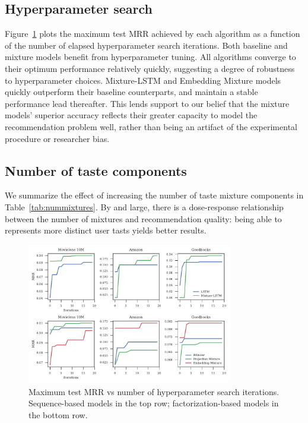 \documentclass[sigconf]{acmart}
\begin{document}
\subsection{Hyperparameter search}
Figure~\ref{fig:hyper} plots the maximum test MRR achieved by each algorithm as a function of the number of elapsed hyperparameter search iterations. Both baseline and mixture models benefit from hyperparameter tuning. All algorithms converge to their optimum performance relatively quickly, suggesting a degree of robustness to hyperparameter choices. Mixture-LSTM and Embedding Mixture models quickly outperform their baseline counterparts, and maintain a stable performance lead thereafter. This lends support to our belief that the mixture models' superior accuracy reflects their greater capacity to model the recommendation problem well, rather than being an artifact of the experimental procedure or researcher bias.

\subsection{Number of taste components}
We summarize the effect of increasing the number of taste mixture components in Table~\ref{tab:nummixtures}. By and large, there is a dose-response relationship between the number of mixtures and recommendation quality: being able to represents more distinct user tasts yields better results.






\begin{figure}[h]
  \captionsetup{width=.8\linewidth}
  \caption{Maximum test MRR vs number of hyperparameter search iterations. Sequence-based models in the top row; factorization-based models in the bottom row.}
  \label{fig:hyper}
  \includegraphics[width=0.8\textwidth]{includes/hyperparam_search.pdf}
\end{figure}




\end{document}
